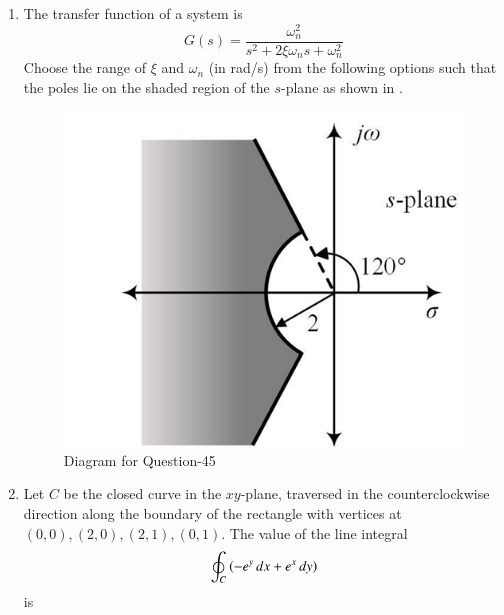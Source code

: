 \documentclass[journal,12pt,onecolumn]{IEEEtran}
\theoremstyle{remark}
\begin{document}
\begin{enumerate}
\item The transfer function of a system is 
$$G(s) = \frac{\omega_n^2}{s^2 + 2 \xi \omega_n s + \omega_n^2}$$
Choose the range of $\xi$ and $\omega_n$ (in rad/s) from the following options such that the poles lie on the shaded region of the $s$-plane as shown in .
\par\hfill{}
\begin{figure}[H]
    \centering
    \includegraphics[width=0.4\columnwidth]{Figs/Q-45.png}
    \caption{Diagram for Question-45}
    \label{45}
\end{figure}
    \begin{enumerate}
    \end{enumerate}

\item Let $C$ be the closed curve in the $xy$-plane, traversed in the counterclockwise direction along the boundary of the rectangle with vertices at $(0,0), (2,0), (2,1), (0,1)$. The value of the line integral
$$
\oint_C \brak{-e^y \, dx + e^x \, dy}
$$
is 
\par\hfill{}
    \begin{enumerate}
    \end{enumerate}


\end{enumerate}
\end{document}
